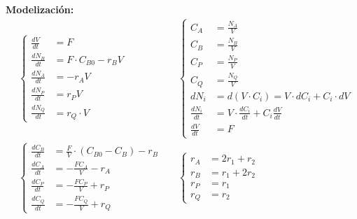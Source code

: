 \begin{enumerate}[label=\Roman*.]
	      \textbf{Modelización:}
	      \begin{align*}
		       & \left\{
		      \begin{aligned}
			      \frac{dV}{dt}   & = F                      \\[6pt]
			      \frac{dN_B}{dt} & = F \cdot C_{B0} - r_B V \\[6pt]
			      \frac{dN_A}{dt} & = - r_A V                \\[6pt]
			      \frac{dN_P}{dt} & = r_P V                  \\[6pt]
			      \frac{dN_Q}{dt} & = r_Q \cdot V
		      \end{aligned}
		      \right.
		       &         &
		      \left\{
		      \begin{aligned}
			      C_A             & = \frac{N_A}{V}                                \\[6pt]
			      C_B             & = \frac{N_B}{V}                                \\[6pt]
			      C_P             & = \frac{N_P}{V}                                \\[6pt]
			      C_Q             & = \frac{N_Q}{V}                                \\[6pt]
			      dN_i            & = d(V \cdot C_i) = V \cdot dC_i + C_i \cdot dV \\[6pt]
			      \frac{dN_i}{dt} & = V \cdot \frac{dC_i}{dt} + C_i \frac{dV}{dt}  \\[6pt]
			      \frac{dV}{dt}   & = F
		      \end{aligned}
		      \right.
		      \\[1.5em]
		       & \left\{
		      \begin{aligned}
			      \frac{dC_B}{dt} & = \frac{F}{V}\cdot (C_{B0}-C_B) - r_B \\[6pt]
			      \frac{dC_A}{dt} & = -\frac{F C_A}{V} - r_A              \\[6pt]
			      \frac{dC_P}{dt} & = -\frac{F C_P}{V} + r_P              \\[6pt]
			      \frac{dC_Q}{dt} & = -\frac{F C_Q}{V} + r_Q
		      \end{aligned}
		      \right.
		       &         &
		      \left\{
		      \begin{aligned}
			      r_A & = 2 r_1 + r_2 \\[6pt]
			      r_B & = r_1 + 2 r_2 \\[6pt]
			      r_P & = r_1         \\[6pt]
			      r_Q & = r_2
		      \end{aligned}
		      \right.
	      \end{align*}


\end{enumerate}
